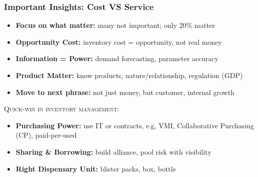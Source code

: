 \documentclass[10pt,handout,notes=show]{beamer}
\begin{document}
\begin{frame}
  \frametitle{Important Insights: Cost VS Service }

  \begin{itemize}
    \item \textbf{Focus on what matter:} many not important; only 20\% matter
    \item \textbf{Opportunity Cost:} inventory cost = opportunity, not real money
    \item \textbf{Information = Power:} demand forecasting, parameter accuracy
    \item \textbf{Product Matter:} know products, nature/relationship, regulation (GDP)
    \item \textbf{Move to next phrase:} not just money, but customer, internal growth
  \end{itemize}

  \NextLine
  \textsc{Quick-win in inventory management:}
  \begin{itemize}
    \item<2-> \textbf{Purchasing Power:} use IT or contracts, e.g, VMI, Collaborative Purchasing (CP), paid-per-used
    \item<2-> \textbf{Sharing \& Borrowing:} build alliance, pool risk with \alert{visibility}
    \item<2-> \textbf{Right Dispensary Unit:}  blister packs, box, bottle
  \end{itemize}


\end{frame}

\end{document}
